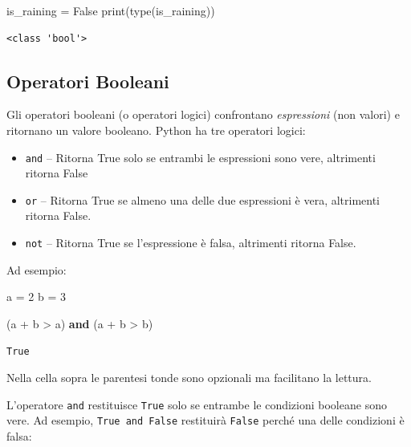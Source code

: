 \documentclass[
  letterpaper,
  krantz2]{{[}./krantz{]}}
\newenvironment{Shaded}{\begin{snugshade}}{\end{snugshade}}
\newcommand{\BuiltInTok}[1]{\textcolor[rgb]{0.00,0.23,0.31}{#1}}
\newcommand{\DecValTok}[1]{\textcolor[rgb]{0.68,0.00,0.00}{#1}}
\newcommand{\KeywordTok}[1]{\textcolor[rgb]{0.00,0.23,0.31}{\textbf{#1}}}
\newcommand{\NormalTok}[1]{\textcolor[rgb]{0.00,0.23,0.31}{#1}}
\newcommand{\OperatorTok}[1]{\textcolor[rgb]{0.37,0.37,0.37}{#1}}
\newcommand{\VariableTok}[1]{\textcolor[rgb]{0.07,0.07,0.07}{#1}}
\providecommand{\tightlist}{%
  \setlength{\itemsep}{0pt}\setlength{\parskip}{0pt}}\usepackage{longtable,booktabs,array}
\begin{document}
\begin{Shaded}
\begin{Highlighting}[]
\NormalTok{is\_raining }\OperatorTok{=} \VariableTok{False}
\BuiltInTok{print}\NormalTok{(}\BuiltInTok{type}\NormalTok{(is\_raining))}
\end{Highlighting}
\end{Shaded}

\begin{verbatim}
<class 'bool'>
\end{verbatim}

\subsection{Operatori Booleani}\label{operatori-booleani}

Gli operatori booleani (o operatori logici) confrontano
\emph{espressioni} (non valori) e ritornano un valore booleano. Python
ha tre operatori logici:

\begin{itemize}
\tightlist
\item
  \texttt{and} -- Ritorna True solo se entrambi le espressioni sono
  vere, altrimenti ritorna False
\item
  \texttt{or} -- Ritorna True se almeno una delle due espressioni è
  vera, altrimenti ritorna False.
\item
  \texttt{not} -- Ritorna True se l'espressione è falsa, altrimenti
  ritorna False.
\end{itemize}

Ad esempio:

\begin{Shaded}
\begin{Highlighting}[]
\NormalTok{a }\OperatorTok{=} \DecValTok{2}
\NormalTok{b }\OperatorTok{=} \DecValTok{3}

\NormalTok{(a }\OperatorTok{+}\NormalTok{ b }\OperatorTok{\textgreater{}}\NormalTok{ a) }\KeywordTok{and}\NormalTok{ (a }\OperatorTok{+}\NormalTok{ b }\OperatorTok{\textgreater{}}\NormalTok{ b)}
\end{Highlighting}
\end{Shaded}

\begin{verbatim}
True
\end{verbatim}

Nella cella sopra le parentesi tonde sono opzionali ma facilitano la
lettura.

L'operatore \texttt{and} restituisce \texttt{True} solo se entrambe le
condizioni booleane sono vere. Ad esempio, \texttt{True\ and\ False}
restituirà \texttt{False} perché una delle condizioni è falsa:
\end{document}
